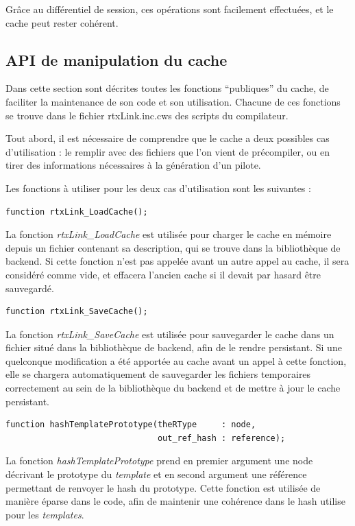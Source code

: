 \documentclass[french]{rtxreport}
\begin{document}
Grâce au différentiel de session, ces opérations sont facilement effectuées, et
le cache peut rester cohérent.


\subsection{API de manipulation du cache}

Dans cette section sont décrites toutes les fonctions ``publiques'' du cache,
de faciliter la maintenance de son code et son utilisation.  Chacune de ces
fonctions se trouve dans le fichier rtxLink.inc.cws des scripts du compilateur.

Tout abord, il est nécessaire de comprendre que le cache a deux possibles cas
d'utilisation : le remplir avec des fichiers que l'on vient de précompiler, ou
en tirer des informations nécessaires à la génération d'un pilote.

\vspace{20pt}

Les fonctions à utiliser pour les deux cas d'utilisation sont les suivantes :

\begin{lstlisting}
function rtxLink_LoadCache();
\end{lstlisting}
La fonction \emph{rtxLink\_LoadCache} est utilisée pour charger le cache en
mémoire depuis un fichier contenant sa description, qui se trouve dans la
bibliothèque de backend. Si cette fonction n'est pas appelée avant un autre
appel au cache, il sera considéré comme vide, et effacera l'ancien cache si il
devait par hasard être sauvegardé.

\begin{lstlisting}
function rtxLink_SaveCache();
\end{lstlisting}
La fonction \emph{rtxLink\_SaveCache} est utilisée pour sauvegarder le cache
dans un fichier situé dans la bibliothèque de backend, afin de le rendre
persistant. Si une quelconque modification a été apportée au cache avant un
appel à cette fonction, elle se chargera automatiquement de sauvegarder les
fichiers temporaires correctement au sein de la bibliothèque du backend et de
mettre à jour le cache persistant.

\begin{lstlisting}
function hashTemplatePrototype(theRType     : node,
                               out_ref_hash : reference);
\end{lstlisting}
La fonction \emph{hashTemplatePrototype} prend en premier argument une node
décrivant le prototype du \emph{template} et en second argument une référence
permettant de renvoyer le hash du prototype. Cette fonction est utilisée de
manière éparse dans le code, afin de maintenir une cohérence dans le hash
utilise pour les \emph{templates}.
\end{document}
